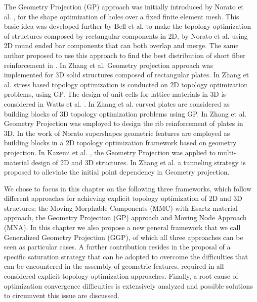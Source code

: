 The Geometry Projection (GP) approach was initially introduced by Norato et al. \cite{norato2004geometry}, for the shape optimization of holes over a fixed finite element mesh. This basic idea was developed further by Bell et al. \cite{bell2012geometry} to make the topology optimization of structures composed by rectangular components in 2D, by Norato et al. \cite{norato2015geometryde} using 2D round ended bar components that can both overlap and merge. The same author proposed to use this approach to find the best distribution of short fiber reinforcement in \cite{norato2015geometry}. In Zhang et al. \cite{zhang2016geometry} Geometry projection approach was implemented for 3D solid structures composed of rectangular plates. In Zhang et al. \cite{zhang2017stress} stress based topology optimization is conducted on 2D topology optimization problems, using GP. The design of unit cells for lattice materials in 3D is considered in Watts et al. \cite{watts2017geometric}. In Zhang et al. \cite{zhang2018geometry} curved plates are considered as building blocks of 3D topology optimization problems using GP.
In Zhang et al. \cite{zhang2017optimal} Geometry Projection was employed to design the rib reinforcement of plates in 3D.
In the work of Norato \cite{norato2018topology} supershapes geometric features are employed as building blocks in a 2D topology optimization framework based on geometry projection. 
In Kazemi et al. \cite{kazemi2018topology}, the Geometry Projection was applied to multi-material design of 2D and 3D structures.  
In Zhang et al. \cite{zhang2018finding} a tunneling strategy is proposed to alleviate the initial point dependency in Geometry projection.

We chose to focus in this chapter on the following three frameworks, which follow different approaches for achieving explicit topology optimization of 2D and 3D structures: the Moving Morphable Components (MMC) with Esartz material approach, the Geometry Projection (GP) approach and Moving Node Approach (MNA). In this chapter we also propose a new general framework that we call Generalized Geometry Projection (GGP), of which all three approaches can be seen as particular cases. A further contribution resides in the proposal of a specific saturation strategy that can be adopted to overcome the difficulties that can be encountered in the assembly of geometric features, required in all considered explicit topology optimization approaches. Finally, a root cause of optimization convergence difficulties is extensively analyzed and possible solutions to circumvent this issue are discussed.

